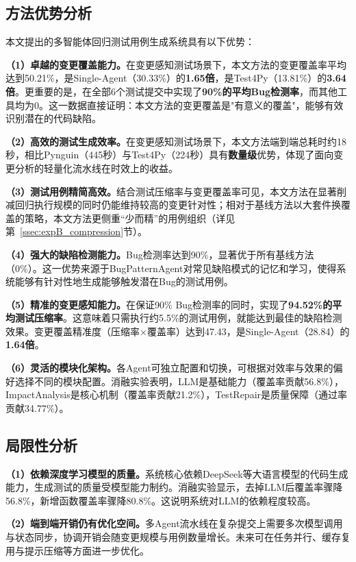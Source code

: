 \subsection{方法优势分析}
\label{ssec:advantage_analysis}

本文提出的多智能体回归测试用例生成系统具有以下优势：

\textbf{（1）卓越的变更覆盖能力。}在变更感知测试场景下，本文方法的变更覆盖率平均达到50.21\%，是Single-Agent（30.33\%）的\textbf{1.65倍}，是Test4Py（13.81\%）的\textbf{3.64倍}。更重要的是，在全部6个测试提交中实现了\textbf{90\%的平均Bug检测率}，而其他工具均为0。这一数据直接证明：本文方法的变更覆盖是"有意义的覆盖"，能够有效识别潜在的代码缺陷。

\textbf{（2）高效的测试生成效率。}在变更感知测试场景下，本文方法端到端总耗时约18秒，相比Pynguin（445秒）与Test4Py（224秒）具有\textbf{数量级}优势，体现了面向变更分析的轻量化流水线在时效上的收益。

\textbf{（3）测试用例精简高效。}结合测试压缩率与变更覆盖率可见，本文方法在显著削减回归执行规模的同时仍能维持较高的变更针对性；相对于基线方法以大套件换覆盖的策略，本文方法更侧重``少而精''的用例组织（详见第~\ref{ssec:expB_compression}节）。

\textbf{（4）强大的缺陷检测能力。}Bug检测率达到90\%，显著优于所有基线方法（0\%）。这一优势来源于BugPatternAgent对常见缺陷模式的记忆和学习，使得系统能够有针对性地生成能够触发潜在Bug的测试用例。

\textbf{（5）精准的变更感知能力。}在保证90\% Bug检测率的同时，实现了\textbf{94.52\%的平均测试压缩率}。这意味着只需执行约5.5\%的测试用例，就能达到最佳的缺陷检测效果。变更覆盖精准度（压缩率×覆盖率）达到47.43，是Single-Agent（28.84）的\textbf{1.64倍}。

\textbf{（6）灵活的模块化架构。}各Agent可独立配置和切换，可根据对效率与效果的偏好选择不同的模块配置。消融实验表明，LLM是基础能力（覆盖率贡献56.8\%），ImpactAnalysis是核心机制（覆盖率贡献21.2\%），TestRepair是质量保障（通过率贡献34.77\%）。

\subsection{局限性分析}
\label{ssec:limitation_analysis}

\textbf{（1）依赖深度学习模型的质量。}系统核心依赖DeepSeek等大语言模型的代码生成能力，生成测试的质量受模型能力制约。消融实验显示，去掉LLM后覆盖率骤降56.8\%，新增函数覆盖率骤降80.8\%。这说明系统对LLM的依赖程度较高。

\textbf{（2）端到端开销仍有优化空间。}多Agent流水线在复杂提交上需要多次模型调用与状态同步，协调开销会随变更规模与用例数量增长。未来可在任务并行、缓存复用与提示压缩等方面进一步优化。

